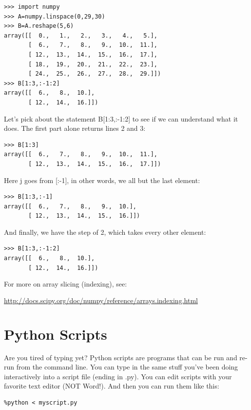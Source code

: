 \documentclass[11pt]{book}
\begin{document}
{{{{ \color{blue} \begin{verbatim}
>>> import numpy
>>> A=numpy.linspace(0,29,30)
>>> B=A.reshape(5,6)
array([[  0.,   1.,   2.,   3.,   4.,   5.],
       [  6.,   7.,   8.,   9.,  10.,  11.],
       [ 12.,  13.,  14.,  15.,  16.,  17.],
       [ 18.,  19.,  20.,  21.,  22.,  23.],
       [ 24.,  25.,  26.,  27.,  28.,  29.]])
>>> B[1:3,:-1:2] 
array([[  6.,   8.,  10.],
       [ 12.,  14.,  16.]])
\end{verbatim}}

Let's pick about the statement {\color{blue}B[1:3,:-1:2]} to see if we can understand what it does.  The first part alone returns lines 2 and 3:
{ \color{blue} \begin{verbatim}
>>> B[1:3]
array([[  6.,   7.,   8.,   9.,  10.,  11.],
       [ 12.,  13.,  14.,  15.,  16.,  17.]])
\end{verbatim}}

Here  {\color{blue}j} goes from [:-1], in other words, we all but the last element:

{ \color{blue} \begin{verbatim}
>>> B[1:3,:-1]
array([[  6.,   7.,   8.,   9.,  10.],
       [ 12.,  13.,  14.,  15.,  16.]])
\end{verbatim}}

\noindent And finally, we have the step of 2, which takes every other element:

{ \color{blue} \begin{verbatim}
>>> B[1:3,:-1:2] 
array([[  6.,   8.,  10.],
       [ 12.,  14.,  16.]])
\end{verbatim}}

\noindent For more on array slicing (indexing), see:

\url{http://docs.scipy.org/doc/numpy/reference/arrays.indexing.html}





\section{Python Scripts}

Are you tired of typing yet? Python scripts are programs that can be run and re-run from the command line.
You can type in the same stuff you've been doing interactively into a script file (ending in .py). You can edit scripts with your favorite text editor (NOT Word!).   And then you can run them like this:

{ \color{blue} \begin{verbatim}
%python < myscript.py
\end{verbatim}}

}}}
\end{document}
